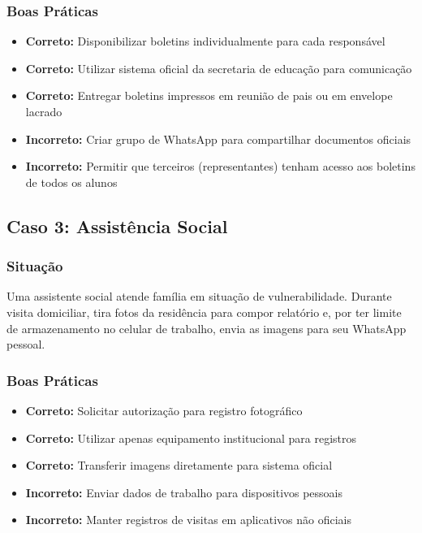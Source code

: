 \documentclass[12pt,a4paper]{article}
\begin{document}
\subsubsection{Boas Práticas}
\begin{itemize}
    \item \textbf{Correto:} Disponibilizar boletins individualmente para cada responsável
    \item \textbf{Correto:} Utilizar sistema oficial da secretaria de educação para comunicação
    \item \textbf{Correto:} Entregar boletins impressos em reunião de pais ou em envelope lacrado
    \item \textbf{Incorreto:} Criar grupo de WhatsApp para compartilhar documentos oficiais
    \item \textbf{Incorreto:} Permitir que terceiros (representantes) tenham acesso aos boletins de todos os alunos
\end{itemize}

\subsection{Caso 3: Assistência Social}

\subsubsection{Situação}
Uma assistente social atende família em situação de vulnerabilidade. Durante visita domiciliar, tira fotos da residência para compor relatório e, por ter limite de armazenamento no celular de trabalho, envia as imagens para seu WhatsApp pessoal.

\subsubsection{Boas Práticas}
\begin{itemize}
    \item \textbf{Correto:} Solicitar autorização para registro fotográfico
    \item \textbf{Correto:} Utilizar apenas equipamento institucional para registros
    \item \textbf{Correto:} Transferir imagens diretamente para sistema oficial
    \item \textbf{Incorreto:} Enviar dados de trabalho para dispositivos pessoais
    \item \textbf{Incorreto:} Manter registros de visitas em aplicativos não oficiais
\end{itemize}
\end{document}
